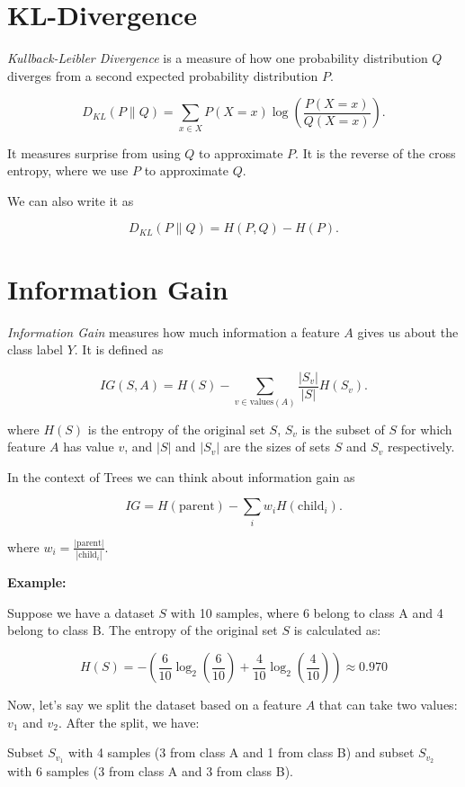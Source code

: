 \section{KL-Divergence}

\emph{Kullback-Leibler Divergence} is a measure of how one probability distribution \(Q\) diverges from a second 
expected probability distribution \(P\).

\[
D_{KL}(P \| Q) = \sum_{x \in X} P(X = x) \log \left(\frac{P(X = x)}{Q(X = x)}\right).
\]

It measures surprise from using \(Q\) to approximate \(P\). It is the reverse of the cross entropy, where we use 
\(P\) to approximate \(Q\).

We can also write it as 

\[
    D_{KL}(P \| Q) = H(P, Q) - H(P).
\]


\section{Information Gain}

\emph{Information Gain} measures how much information a feature \(A\) gives us about the class label \(Y\). It is defined as

\[
    IG(S, A) = H(S) - \sum_{v \in \text{values}(A)} \frac{|S_v|}{|S|} H(S_v).
\]

where \(H(S)\) is the entropy of the original set \(S\), \(S_v\) is the subset of \(S\) 
for which feature \(A\) has value \(v\), and \(|S|\) and \(|S_v|\) are the sizes of sets \(S\) and \(S_v\) respectively.

In the context of Trees we can think about information gain as  

\[
    IG = H(\text{parent}) - \sum_i  w_i H(\text{child}_i).
\]

where \(w_i = \frac{|\text{parent}|}{|\text{child}_i|}\). 

\textbf{Example:}

Suppose we have a dataset \(S\) with 10 samples, where 6 belong to class A and 4 belong to class B. The entropy of the original set \(S\) is calculated as:

\[
    H(S) = -\left(\frac{6}{10} \log_2 \left(\frac{6}{10}\right) + \frac{4}{10} \log_2 \left(\frac{4}{10}\right)\right) \approx 0.970
\]

Now, let's say we split the dataset based on a feature \(A\) that can take two values: \(v_1\) and \(v_2\). After the split, we have:

Subset \(S_{v_1}\) with 4 samples (3 from class A and 1 from class B) and subset \(S_{v_2}\) with 6 samples (3 from class A and 3 from class B).

